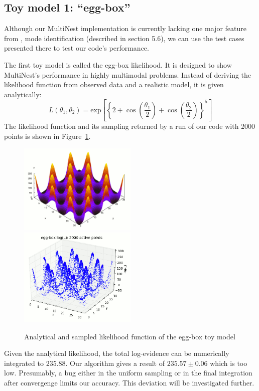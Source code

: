 \documentclass{article}
\begin{document}
\subsection{Toy model 1: ``egg-box''}
Although our MultiNest implementation is currently lacking one major feature from  \cite{2009MNRAS.398.1601F}, mode identification (described in section 5.6), we can use the test cases presented there to test our code's performance.

The first toy model is called the egg-box likelihood. It is designed to show MultiNest's performance in highly multimodal problems. Instead of deriving the likelihood function from observed data and a realistic model, it is given analytically:
\[L(\theta_1,\theta_2) = \mathrm{exp}
\left[\left\{2+\cos\left(\frac{\theta_1}{2}\right)+\cos\left(\frac{\theta_2}{2}\right)\right\}^5\right]\]
The likelihood function and its sampling returned by a run of our code with 2000 points is shown in Figure~\ref{eggbox}.

\begin{figure}
\includegraphics[width=0.5\textwidth]{figures/eggbox_analytic_s.eps}
\includegraphics[width=0.5\textwidth]{figures/eggbox_s.eps}
\caption{Analytical and sampled likelihood function of the egg-box toy model}
\label{eggbox}
\end{figure}

Given the analytical likelihood, the total log-evidence can be numerically integrated to 235.88. Our algorithm gives a result of $235.57\pm 0.06$ which is too low. Presumably, a bug either in the uniform sampling or in the final integration after convergenge limits our accuracy. This deviation will be investigated further.
\end{document}
